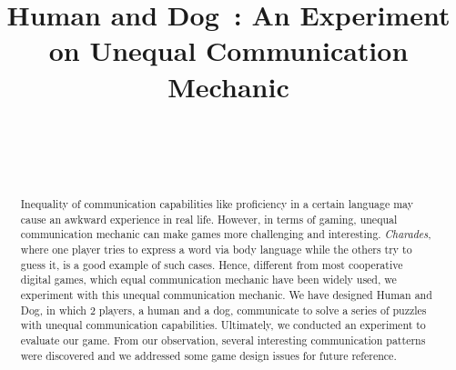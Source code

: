 \documentclass{sigchi}
\begin{document}
\newcommand{\getGameName}{Human and Dog}
\title{\getGameName\ : An Experiment on Unequal Communication Mechanic}

\author{%
  \\
  \\
  \\
}

\maketitle

\begin{abstract}
  Inequality of communication capabilities like proficiency in a certain language may cause an awkward experience in real life. However, in terms of gaming, unequal communication mechanic can make games more challenging and interesting. \textit{Charades}\cite{Charades}, where one player tries to express a word via body language while the others try to guess it, is a good example of such cases. Hence, different from most cooperative digital games, which equal communication mechanic have been widely used, we experiment with this unequal communication mechanic. We have designed \getGameName, in which 2 players, a human and a dog, communicate to solve a series of puzzles with unequal communication capabilities.
  Ultimately, we conducted an experiment to evaluate our game. 
From our observation, several interesting communication patterns were discovered and we addressed some game design issues for future reference.
\end{abstract}
\end{document}

